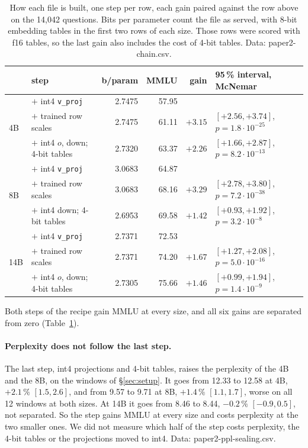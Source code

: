 \begin{table}[t]
\centering\small\setlength{\tabcolsep}{5pt}
\caption{How each file is built, one step per row, each gain paired against the
row above on the 14{,}042 questions. Bits per parameter count the file as
served, with 8-bit embedding tables in the first two rows of each size. Those
rows were scored with f16 tables, so the last gain also includes the cost of
4-bit tables. Data: paper2-chain.csv.}
\label{tab:chain}
\begin{tabular}{llrrrl}
\toprule
 & step & b/param & MMLU & gain & 95\,\% interval, McNemar\\
\midrule
\multirow{3}{*}{4B}
 & \Tetra{} $+$ int4 \texttt{v\_proj} & 2.7475 & 57.95 & & \\
 & $+$ trained row scales & 2.7475 & 61.11 & $+3.15$ & $[+2.56, +3.74]$, $p=1.8\cdot10^{-25}$\\
 & $+$ int4 $o$, down; 4-bit tables & 2.7320 & 63.37 & $+2.26$ & $[+1.66, +2.87]$, $p=8.2\cdot10^{-13}$\\
\midrule
\multirow{3}{*}{8B}
 & \Tetra{} $+$ int4 \texttt{v\_proj} & 3.0683 & 64.87 & & \\
 & $+$ trained row scales & 3.0683 & 68.16 & $+3.29$ & $[+2.78, +3.80]$, $p=7.2\cdot10^{-38}$\\
 & $+$ int4 down; 4-bit tables & 2.6953 & 69.58 & $+1.42$ & $[+0.93, +1.92]$, $p=3.2\cdot10^{-8}$\\
\midrule
\multirow{3}{*}{14B}
 & \Tetra{} $+$ int4 \texttt{v\_proj} & 2.7371 & 72.53 & & \\
 & $+$ trained row scales & 2.7371 & 74.20 & $+1.67$ & $[+1.27, +2.08]$, $p=5.0\cdot10^{-16}$\\
 & $+$ int4 $o$, down; 4-bit tables & 2.7305 & 75.66 & $+1.46$ & $[+0.99, +1.94]$, $p=1.4\cdot10^{-9}$\\
\bottomrule
\end{tabular}
\end{table}

Both steps of the recipe gain MMLU at every size, and all six gains are
separated from zero (Table~\ref{tab:chain}).

\paragraph{Perplexity does not follow the last step.} The last step, int4
projections and 4-bit tables, raises the perplexity of the 4B and the 8B, on
the windows of \S\ref{sec:setup}. It goes from 12.33
to 12.58 at 4B, $+2.1\,\%$ $[1.5, 2.6]$, and from 9.57 to 9.71 at 8B,
$+1.4\,\%$ $[1.1, 1.7]$, worse on all 12 windows at both sizes. At 14B it goes
from 8.46 to 8.44, $-0.2\,\%$ $[-0.9, 0.5]$, not separated. So the step gains
MMLU at every size and costs perplexity at the two smaller ones. We did not
measure which half of the step costs perplexity, the 4-bit tables or the
projections moved to int4. Data: paper2-ppl-sealing.csv.

